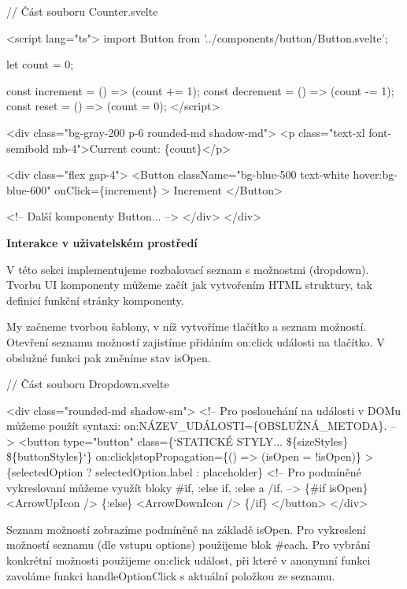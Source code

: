 \begin{prog}
// Část souboru Counter.svelte

<script lang="ts">
  import Button from '../components/button/Button.svelte';

  let count = 0;

  const increment = () => (count += 1);
  const decrement = () => (count -= 1);
  const reset = () => (count = 0);
</script>

<div class="bg-gray-200 p-6 rounded-md shadow-md">
  <p class="text-xl font-semibold mb-4">Current count: \{count\}</p>

  <div class="flex gap-4">
    <Button 
      className="bg-blue-500 text-white hover:bg-blue-600" 
      onClick=\{increment\}
    >
      Increment
    </Button>

    <!-- Další komponenty Button... -->
  </div>
</div>
\end{prog}

\begin{flushleft}
  \textbf{Interakce v uživatelském prostředí}
\end{flushleft}

V této sekci implementujeme rozbalovací seznam s možnostmi (dropdown). Tvorbu UI komponenty můžeme začít jak vytvořením HTML struktury, tak definicí funkční stránky komponenty.

My začneme tvorbou šablony, v níž vytvoříme tlačítko a seznam možností. Otevření seznamu možností zajistíme přidáním on:click události na tlačítko. V obslužné funkci pak změníme stav isOpen.

\begin{prog}
// Část souboru Dropdown.svelte

<div class="rounded-md shadow-sm">
  <!-- Pro poslouchání na události v DOMu můžeme použít syntaxi: 
    on:NÁZEV_UDÁLOSTI=\{OBSLUŽNÁ_METODA\}. -->
  <button
    type="button"
    class=\{`STATICKÉ STYLY... \$\{sizeStyles\} \$\{buttonStyles\}`\}
    on:click|stopPropagation=\{() => (isOpen = !isOpen)\}
  >
    \{selectedOption ? selectedOption.label : placeholder\}
    <!-- Pro podmíněné vykreslovaní můžeme využít bloky
      #if, :else if, :else a /if. -->
    \{#if isOpen\}
      <ArrowUpIcon />
    \{:else\}
      <ArrowDownIcon />
    \{/if\}
  </button>
</div>
\end{prog}

Seznam možností zobrazíme podmíněně na základě isOpen. Pro vykreslení možností seznamu (dle vstupu options) použijeme blok \#each. 
Pro vybrání konkrétní možnosti použijeme on:click událost, při které v anonymní funkci zavoláme funkci handleOptionClick s aktuální položkou ze seznamu.

